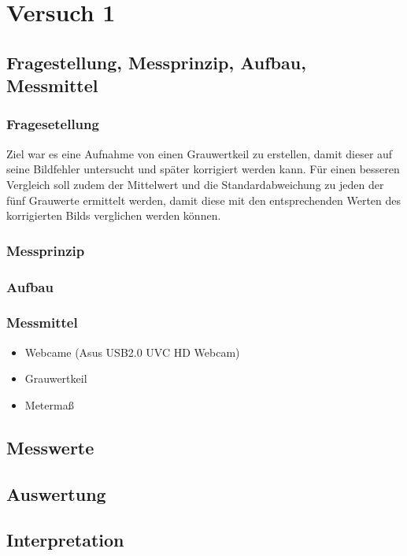 \chapter{Versuch 1}
\label{chap:VERSUCH_1}


\section{Fragestellung, Messprinzip, Aufbau, Messmittel}
\label{chap:VERSUCH_1_FRAGESTELLUNG}

\subsection*{Fragesetellung}

Ziel war es eine Aufnahme von einen Grauwertkeil zu erstellen, damit dieser auf seine Bildfehler untersucht und später korrigiert werden kann.
Für einen besseren Vergleich soll zudem der Mittelwert und die Standardabweichung zu jeden der fünf Grauwerte ermittelt werden, damit diese mit den entsprechenden Werten des korrigierten Bilds verglichen werden können.

\subsection*{Messprinzip}


\subsection*{Aufbau}

\subsection{Messmittel}
\begin{itemize}
\item Webcame (Asus USB2.0 UVC HD Webcam)
\item Grauwertkeil
\item Metermaß
\end{itemize}

\section{Messwerte}
\label{chap:VERSUCH_1_MESSWERTE}


\section{Auswertung}
\label{chap:VERSUCH_1_AUSWERTUNG}

\section{Interpretation}
\label{chap:VERSUCH_1_INTERPRETATION}